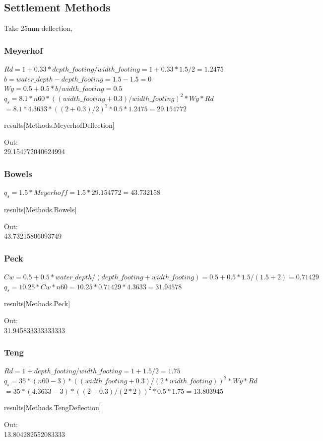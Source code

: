 \subsection{Settlement Methods}
Take 25mm deflection,

\subsubsection{Meyerhof}
$Rd = 1 + 0.33*depth\_footing/width\_footing = 1+0.33*1.5/2= 1.2475$\\
$b = water\_depth-depth\_footing = 1.5-1.5=0$\\
$Wy = 0.5+0.5*b / width\_footing=0.5$\\
$q_s = 8.1*n60*((width\_footing+0.3)/width\_footing)^2*Wy*Rd$\\
$=8.1*4.3633*((2+0.3)/2)^2*0.5*1.2475=29.154772$
\begin{python}
results[Methods.MeyerhofDeflection]
\end{python}
Out:\\
29.154772040624994

\subsubsection{Bowels}
$q_s = 1.5*Meyerhoff = 1.5*29.154772= 43.732158$
\begin{python}
results[Methods.Bowels]
\end{python}
Out:\\
43.73215806093749

\subsubsection{Peck}
$Cw = 0.5 + 0.5*water\_depth/(depth\_footing+width\_footing) = 0.5+0.5*1.5/(1.5+2) = 0.71429$\\
$q_s =  10.25*Cw*n60 = 10.25*0.71429*4.3633 = 31.94578$
\begin{python}
results[Methods.Peck]
\end{python}
Out:\\
31.945833333333333

\subsubsection{Teng}
$Rd = 1 + depth\_footing/width\_footing = 1 + 1.5/2 = 1.75$\\
$q_s =  35*(n60-3)*((width\_footing+0.3)/(2*width\_footing))^2*Wy*Rd$\\
$ = 35*(4.3633-3)*((2+0.3)/(2*2))^2*0.5*1.75= 13.803945$
\begin{python}
results[Methods.TengDeflection]
\end{python}
Out:\\
13.804282552083333

